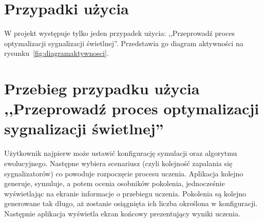 \section*{Przypadki użycia}
W projekt występuje tylko jeden przypadek użycia: ,,Przeprowadź proces optymalizacji sygnalizacji świetlnej''. Przedstawia go diagram aktywności na rysunku~\ref{fig:diagramaktywnosci}. 
\section*{Przebieg przypadku użycia ,,Przeprowadź proces optymalizacji sygnalizacji świetlnej''}
Użytkownik najpierw może ustawić konfigurację symulacji oraz algorytmu ewolucyjnego. Następne wybiera scenariusz (czyli kolejność zapalania się sygnalizatorów) co powoduje rozpoczęcie procesu uczenia. Aplikacja kolejno generuje, symuluje, a potem ocenia osobników pokolenia, jednocześnie wyświetlając na ekranie informacje o przebiegu uczenia. Pokolenia są kolejno generowane tak długo, aż zostanie osiągnięta ich liczba określona w konfiguracji. Następnie aplikacja wyświetla ekran końcowy prezentujący wyniki uczenia.
